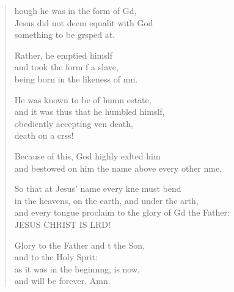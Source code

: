 \begin{verse}
  \begin{patverse}
    hough he was in the form of Gd,\Flex\\
    Jesus did not deem equalit with God\Med\\
    something to be grsped at.
    
    Rather, he emptied himslf\Flex\\
    and took the form f a slave,\Med\\
    being born in the likeness of mn.
    
    He was known to be of humn estate,\Med\\
    and it was thus that he humbled himslf,\\
    obediently accepting ven death,\Med\\
    death on a crss!
    
    Because of this, God highly exlted him\Med\\
    and bestowed on him the name above every other nme,
    
    So that at Jesus’ name every kne must bend\Med\\
    in the heavens, on the earth, and under the arth,\\
    and every tongue proclaim to the glory of Gd the Father:\Med\\
    JESUS CHRIST IS LRD!

    Glory to the Father and t the Son,\Med\\
    and to the Holy Sp\pointup{\i}rit:\\
    as it was in the beginn\pointup{\i}ng, is now,\Med\\
    and will be forever. Amn.
  \end{patverse}
\end{verse}
